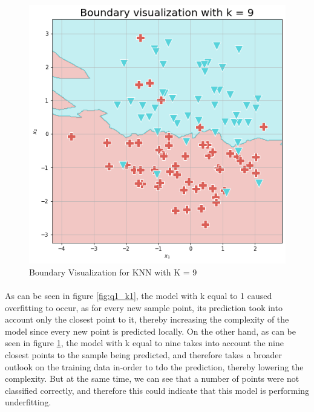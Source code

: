 \documentclass{article}
\begin{document}
    \begin{figure}[H]
        \centering
        \includegraphics[scale=0.4]{q1_k9.png}
        \caption{Boundary Visualization for KNN with K = 9}
        \label{fig:q1_k9}
    \end{figure}
    \paragraph*{}
    As can be seen in figure \ref{fig:q1_k1}, the model with k equal to 1 caused overfitting to occur, as for every new sample point, its prediction took into account only the closest point to it, thereby increasing the complexity of the model since every new point is predicted locally. On the other hand, as can be seen in figure \ref{fig:q1_k9}, the model with k equal to nine takes into account the nine closest points to the sample being predicted, and therefore takes a broader outlook on the training data in-order to tdo the prediction, thereby lowering the complexity. But at the same time, we can see that a number of points were not classified correctly, and therefore this could indicate that this model is performing underfitting.
    
\end{document}

